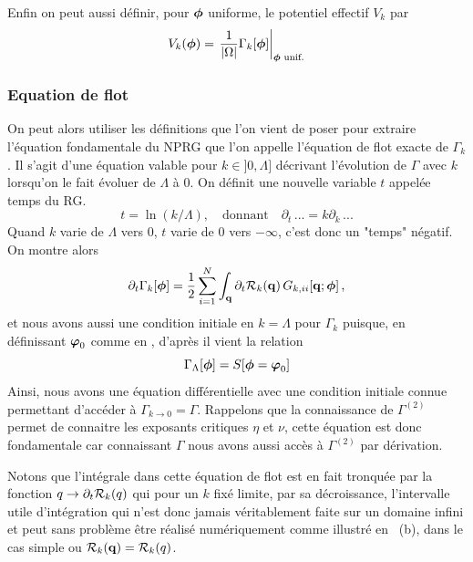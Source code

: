 \documentclass[10pt]{article}
\begin{document}
\begin{multicols}{2}
Enfin on peut aussi définir, pour $\boldsymbol{ \phi}$ uniforme, le potentiel effectif $V_k$ par
\begin{equation}
	V_k(\boldsymbol{ \phi}) = {\left. \frac{1}{|\Omega|} \Gamma_k[\boldsymbol{ \phi}] \right|}_{\boldsymbol{ \phi} \text{ unif.}}
	\label{eq:defPot}
\end{equation}

\vspace*{11pt}


\subsubsection{Equation de flot}

On peut alors utiliser les définitions que l'on vient de poser pour extraire l'équation fondamentale du NPRG que l'on appelle l'équation de flot exacte de $\Gamma_k$. Il s'agit d'une équation valable pour $k \in ]0, \Lambda]$ décrivant l'évolution de $\Gamma$ avec $k$ lorsqu'on le fait évoluer de $\Lambda$ à $0$. On définit une nouvelle variable $t$ appelée temps du RG.
\begin{equation}
	t = \ln(k/\Lambda), \quad \text{donnant} \quad \partial_t \, ... = k\partial_k \, ...
\end{equation}
Quand $k$ varie de $\Lambda$ vers $0$, $t$ varie de $0$ vers $-\infty$, c'est donc un "temps" négatif. On montre alors
\begin{equation}
\partial_t \Gamma_{k}	[\boldsymbol{ \phi}] = \frac{1}{2} \sum\limits_{i=1}^{N} \int_{\bf q} \partial_t \mathcal{R}_k({\bf q}) \, G_{k, ii}[{\bf q}; \boldsymbol{ \phi}] \, ,
	\label{eq:flot}
\end{equation}
et nous avons aussi une condition initiale  en $k = \Lambda$ pour $\Gamma_k$ puisque, en définissant $\boldsymbol{ \varphi}_0$ comme en , d'après  il vient la relation
\begin{equation}
	\Gamma_\Lambda [\boldsymbol{ \phi}] = S[\boldsymbol{ \phi} = \boldsymbol{ \varphi}_0]
	\label{eq:initFlotBMW}
\end{equation}
Ainsi, nous avons une équation différentielle avec une condition initiale connue permettant d'accéder à $\Gamma_{k \to 0} = \Gamma$. Rappelons que la connaissance de $\Gamma^{(2)}$ permet de connaitre les exposants critiques $\eta$ et $\nu$, cette équation est donc fondamentale car connaissant $\Gamma$ nous avons aussi accès à $\Gamma^{(2)}$ par dérivation.

Notons que l'intégrale dans cette équation de flot est en fait tronquée par la fonction $q \to \partial_t\mathcal{R}_k(q)$ qui pour un $k$ fixé limite, par sa décroissance, l'intervalle utile d'intégration qui n'est donc jamais véritablement faite sur un domaine infini et peut sans problème être réalisé numériquement comme illustré en \, (b),  dans le cas simple ou $\mathcal{R}_k({\bf q}) = \mathcal{R}_k(q)$.


\end{multicols}
\end{document}
